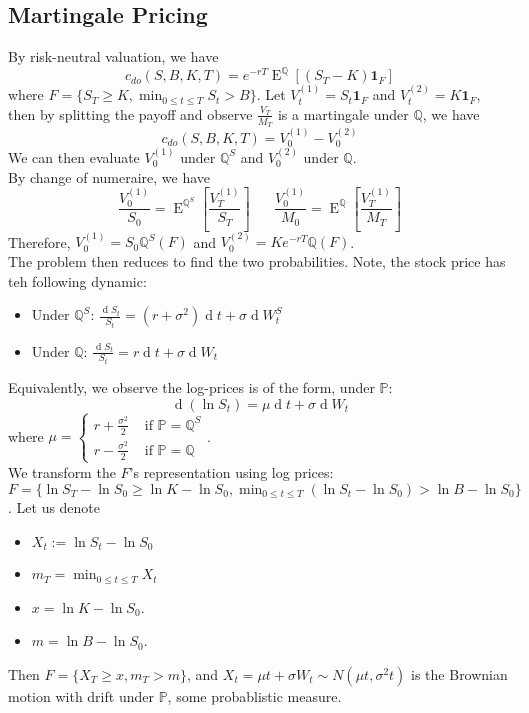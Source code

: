 \documentclass[12pt]{article}
\theoremstyle{definition}
\DeclareMathOperator{\diff}{d}
\DeclareMathOperator{\expec}{E}
\begin{document}
\subsection{Martingale Pricing}
By risk-neutral valuation, we have
\[
c_{do}(S,B,K,T)=e^{-rT}\expec^{\mathbb{Q}}[(S_T-K)\mathbf{1}_F]
\]
where $F=\{S_T\geq K, \min_{0\leq t\leq T} S_t>B\}$. Let $V_t^{(1)}=S_t\mathbf{1}_F$ and $V_t^{(2)}=K\mathbf{1}_F$, then by splitting the payoff and observe $\frac{V_T}{M_T}$ is a martingale under $\mathbb{Q}$, we have
\[
c_{do}(S,B,K,T)=V_0^{(1)}-V_0^{(2)}
\]
We can then evaluate $V_0^{(1)}$ under $\mathbb{Q}^S$ and $V_0^{(2)}$ under $\mathbb{Q}$.\\
By change of numeraire, we have
\[
\frac{V_0^{(1)}}{S_0}=\expec^{\mathbb{Q}^S}[\frac{V_T^{(1)}}{S_T}]\;\;\;\;\;\;\frac{V_0^{(1)}}{M_0}=\expec^{\mathbb{Q}}[\frac{V_T^{(1)}}{M_T}]
\]
Therefore, $V_0^{(1)}=S_0\mathbb{Q}^S(F)$ and $V_0^{(2)}=Ke^{-rT}\mathbb{Q}(F)$.\\
The problem then reduces to find the two probabilities. Note, the stock price has teh following dynamic:
\begin{itemize}
  \item Under $\mathbb{Q}^S$: $\frac{\diff S_t}{S_t}=(r+\sigma^2)\diff t+\sigma \diff W_t^S$
  \item Under $\mathbb{Q}$: $\frac{\diff S_t}{S_t}=r\diff t+\sigma\diff W_t$
\end{itemize}
Equivalently, we observe the log-prices is of the form, under $\mathbb{P}$:
\[
\diff (\ln S_t)=\mu\diff t+\sigma\diff W_t
\]
where $\mu=\begin{cases} r+\frac{\sigma^2}{2}&\text{ if }\mathbb{P}=\mathbb{Q}^S\\r-\frac{\sigma^2}{2}&\text{ if }\mathbb{P}=\mathbb{Q}\end{cases}$.\\
We transform the $F$'s representation using log prices: $F=\{\ln S_T-\ln S_0\geq \ln K-\ln S_0, \min_{0\leq t\leq T}(\ln S_t-\ln S_0)>\ln B-\ln S_0\}$. Let us denote 
\begin{itemize}
\item $X_t:=\ln S_t-\ln S_0$
\item $m_T=\min_{0\leq t\leq T} X_t$
\item $x=\ln K-\ln S_0$.
\item $m=\ln B-\ln S_0$.
\end{itemize}
Then $F=\{X_T\geq x, m_T>m\}$, and $X_t=\mu t+\sigma W_t\sim N(\mu t, \sigma^2t)$ is the Brownian motion with drift under $\mathbb{P}$, some probablistic measure.\\
\end{document}

